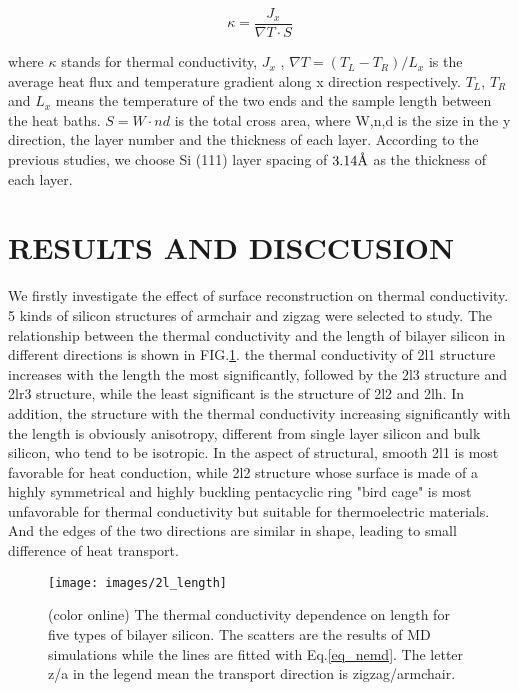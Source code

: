 \documentclass[%
 reprint,
 amsmath,amssymb,
 aps,
 prb,
]{revtex4-1}
\newcommand{\angstrom}{\mbox{\normalfont\AA}}
\begin{document}
\begin{equation}
\kappa = \frac{ J_x}{ \nabla T \cdot S} \label{eq_nemd}
\end{equation}

where $\kappa$ stands for thermal conductivity, $J_x$ , $\nabla T=(T_L-T_R)/L_x$ is the average heat flux and temperature gradient along x direction respectively. $T_L$, $T_R$ and $L_x$ means the temperature of the two ends and the sample length between the heat baths. $S=W \cdot nd$ is the total cross area, where W,n,d is the size in the y direction, the layer number and the thickness of each layer. According to the previous studies, we choose Si (111) layer spacing of $3.14 \angstrom$ as the thickness of each layer.



\section{RESULTS AND DISCCUSION}

We firstly investigate the effect of surface reconstruction on thermal conductivity. 5 kinds of silicon structures of armchair and zigzag were selected to study. The relationship between the thermal conductivity and the length of bilayer silicon in different directions is shown in FIG.\ref{fig:2l_length}. the thermal conductivity of 2l1 structure increases with the length the most significantly, followed by the 2l3 structure and 2lr3 structure, while the least significant is the structure of 2l2 and 2lh. In addition, the structure with the thermal conductivity increasing significantly with the length is obviously anisotropy, different from single layer silicon and bulk silicon, who tend to be isotropic. In the aspect of structural, smooth 2l1 is most favorable for heat conduction, while 2l2 structure whose surface is made of a highly symmetrical and highly buckling pentacyclic ring "bird cage" is most unfavorable for thermal conductivity but suitable for thermoelectric materials. And the edges of the two directions are similar in shape, leading to small difference of heat transport.

\begin{figure}[b]
\texttt{[image: images/2l\_length]}
\caption{\label{fig:2l_length} (color online) The thermal conductivity dependence on length for five types of bilayer silicon. The scatters are the results of MD simulations while the lines are fitted with Eq.\ref{eq_nemd}. The letter z/a in the legend mean the transport direction is zigzag/armchair.}
\end{figure}
\end{document}

